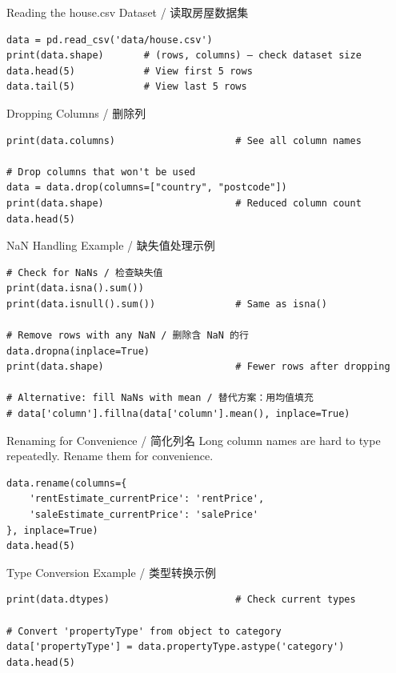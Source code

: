 \documentclass[11pt,a4paper]{report}
\begin{document}
\begin{examplebox}{Reading the house.csv Dataset / 读取房屋数据集}
\begin{lstlisting}
data = pd.read_csv('data/house.csv')
print(data.shape)       # (rows, columns) — check dataset size
data.head(5)            # View first 5 rows
data.tail(5)            # View last 5 rows
\end{lstlisting}
\end{examplebox}

\begin{examplebox}{Dropping Columns / 删除列}
\begin{lstlisting}
print(data.columns)                     # See all column names

# Drop columns that won't be used
data = data.drop(columns=["country", "postcode"])
print(data.shape)                       # Reduced column count
data.head(5)
\end{lstlisting}
\end{examplebox}

\begin{examplebox}{NaN Handling Example / 缺失值处理示例}
\begin{lstlisting}
# Check for NaNs / 检查缺失值
print(data.isna().sum())
print(data.isnull().sum())              # Same as isna()

# Remove rows with any NaN / 删除含 NaN 的行
data.dropna(inplace=True)
print(data.shape)                       # Fewer rows after dropping

# Alternative: fill NaNs with mean / 替代方案：用均值填充
# data['column'].fillna(data['column'].mean(), inplace=True)
\end{lstlisting}
\end{examplebox}

\begin{examplebox}{Renaming for Convenience / 简化列名}
    Long column names are hard to type repeatedly. Rename them for convenience.
\begin{lstlisting}
data.rename(columns={
    'rentEstimate_currentPrice': 'rentPrice',
    'saleEstimate_currentPrice': 'salePrice'
}, inplace=True)
data.head(5)
\end{lstlisting}
\end{examplebox}

\begin{examplebox}{Type Conversion Example / 类型转换示例}
\begin{lstlisting}
print(data.dtypes)                      # Check current types

# Convert 'propertyType' from object to category
data['propertyType'] = data.propertyType.astype('category')
data.head(5)
\end{lstlisting}
\end{examplebox}
\end{document}
